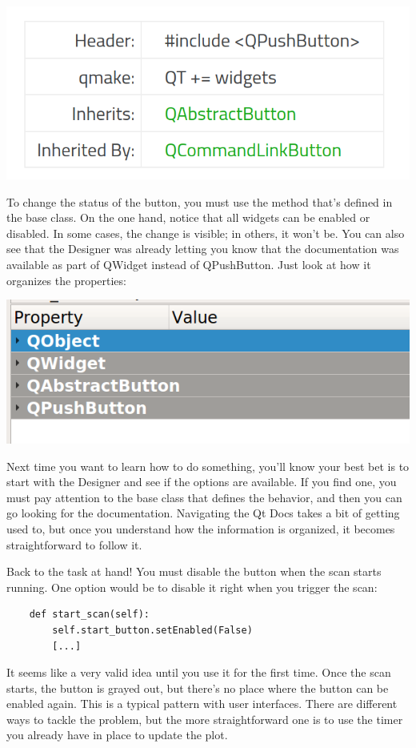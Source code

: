 \begin{center}
    \includegraphics[width=.4\linewidth]{images/Chapter_09/11_Qt_Docs_inheritance.png}
\end{center}

To change the status of the button, you must use the  method that's defined in the base  class. On the one hand, notice that all widgets can be enabled or disabled. In some cases, the change is visible; in others, it won't be. You can also see that the Designer was already letting you know that the documentation was available as part of QWidget instead of QPushButton. Just look at how it organizes the properties:

\begin{center}
    \includegraphics[width=.4\linewidth]{images/Chapter_09/12_Designer_object_inheritance.png}
\end{center}

Next time you want to learn how to do something, you'll know your best bet is to start with the Designer and see if the options are available. If you find one, you must pay attention to the base class that defines the behavior, and then you can go looking for the documentation. Navigating the Qt Docs takes a bit of getting used to, but once you understand how the information is organized, it becomes straightforward to follow it.

Back to the task at hand! You must disable the button when the scan starts running. One option would be to disable it right when you trigger the scan:

\begin{verbatim}
    def start_scan(self):
        self.start_button.setEnabled(False)
        [...]
\end{verbatim}

It seems like a very valid idea until you use it for the first time. Once the scan starts, the button is grayed out, but there's no place where the button can be enabled again. This is a typical pattern with user interfaces. There are different ways to tackle the problem, but the more straightforward one is to use the timer you already have in place to update the plot.

